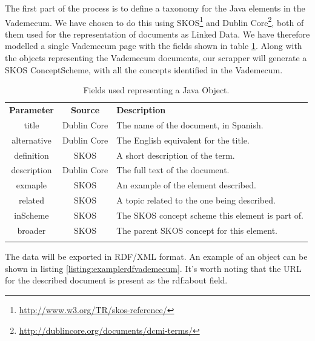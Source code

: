 The first part of the process is to define a taxonomy for the Java elements in the Vademecum. We have chosen to do this using SKOS\footnote{\url{http://www.w3.org/TR/skos-reference/}} and Dublin Core\footnote{\url{http://dublincore.org/documents/dcmi-terms/}}, both of them used for the representation of documents as Linked Data. We have therefore modelled a single Vademecum page with the fields shown in table \ref{tab:taxonomyfields}. Along with the objects representing the Vademecum documents, our scrapper will generate a SKOS ConceptScheme, with all the concepts identified in the Vademecum. 

\begin{center}
  \begin{table}
    \begin{tabular*}{0.7\textwidth}{@{\extracolsep{\fill}} | c | c | p{} |}
      \hhline{|-|-|-|}
      \textbf{Parameter} & \textbf{Source} & \textbf{Description} \\ \hhline{|=|=|=|}
      title & Dublin Core &  The name of the document, in Spanish. \\ \hhline{|-|-|-|}
      alternative & Dublin Core & The English equivalent for the title. \\ \hhline{|-|-|-|}
      definition & SKOS & A short description of the term.  \\ \hhline{|-|-|-|}
      description & Dublin Core & The full text of the document.  \\ \hhline{|-|-|-|}
      exmaple & SKOS & An example of the element described.  \\ \hhline{|-|-|-|}
      related & SKOS & A topic related to the one being described. \\ \hhline{|-|-|-|}
      inScheme & SKOS & The SKOS concept scheme this element is part of.  \\ \hhline{|-|-|-|}
      broader & SKOS & The parent SKOS concept for this element. \\ \hhline{|-|-|-|}
      \end{tabular*}
    \caption{Fields used representing a Java Object.}
    \label{tab:taxonomyfields}
  \end{table}
\end{center}

The data will be exported in RDF/XML format. An example of an object can be shown in listing \ref{listing:examplerdfvademecum}. It's worth noting that the URL for the described document is present as the rdf:about field.

